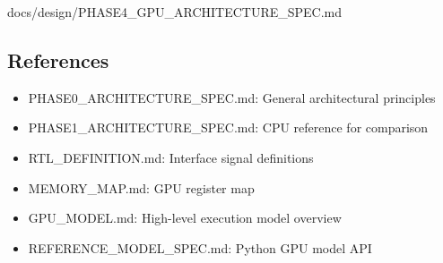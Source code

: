 \begin{relocated}{docs/design/PHASE4_GPU_ARCHITECTURE_SPEC.md}
\subsection{References}\label{ds:ch:phase4-gpu-architecture:references}

\begin{itemize}
\tightlist
\item
  PHASE0\_\allowbreak{}ARCHITECTURE\_\allowbreak{}SPEC.md: General
  architectural principles
\item
  PHASE1\_\allowbreak{}ARCHITECTURE\_\allowbreak{}SPEC.md: CPU reference
  for comparison
\item
  RTL\_\allowbreak{}DEFINITION.md: Interface signal definitions
\item
  MEMORY\_\allowbreak{}MAP.md: GPU register map
\item
  GPU\_\allowbreak{}MODEL.md: High-level execution model overview
\item
  REFERENCE\_\allowbreak{}MODEL\_\allowbreak{}SPEC.md: Python GPU model
  API
\end{itemize}
\end{relocated}

